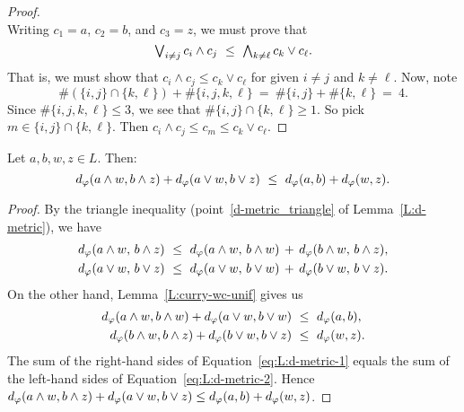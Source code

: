 \documentclass[main.tex]{subfiles}
\begin{document}
\begin{proof}
\begin{equation*}
\end{equation*}
Writing $c_1 = a$, $c_2 = b$, and $c_3 = z$,
we must prove that 
\begin{equation*}
\textstyle{\bigvee}_{i\neq j}\, c_i \wedge c_j \ \leq\ \textstyle{\bigwedge}_{k\neq \ell}\, c_k \vee c_\ell.
\end{equation*}
That is,
we must show that 
$c_i \wedge c_j \leq c_k \vee c_\ell$
for given $i\neq j$ and $k\neq \ell$.
Now, note
\begin{equation*}
\# (\{ i,j \} \cap \{ k,\ell\}) + \#\{i,j,k,\ell\}
\ = \ \# \{i,j\} + \# \{k,\ell \}
\ = \ 4.
\end{equation*}
Since  $\# \{ i,j,k,\ell \}\leq 3$,
we see that $\# \{ i,j \} \cap \{ k,\ell\} \geq 1$.
So pick $m\in  \{ i,j \} \cap \{ k,\ell\}$.
Then $c_i \wedge c_j \leq c_m \leq c_k \vee c_\ell$.
\end{proof}
%
%
\begin{lem}
\label{L:wv-unif}
Let $a,b,w,z\in L$.  Then:
\begin{equation*}
\ld\varphi(a\wedge w,b\wedge z) + \ld\varphi(a \vee w,b\vee z)
\ \leq\ 
\ld\varphi(a,b) + \ld\varphi(w,z).
\end{equation*}
\end{lem}
\begin{proof}
By the triangle inequality (point~\ref{d-metric_triangle}
of Lemma~\ref{L:d-metric}),
we have
\begin{equation}
\label{eq:L:d-metric-1}
\begin{alignedat}{3}
\ld\varphi(a\wedge w,\,b\wedge z)\ &\leq\ 
\ld\varphi(a\wedge w,\,b\wedge w)\,+\,
\ld\varphi(b\wedge w,\,b\wedge z), \\
\ld\varphi(a\vee w,\,b\vee z)\ &\leq\ 
\ld\varphi(a\vee w,\,b\vee w)\,+\,
\ld\varphi(b\vee w,\,b\vee z).
\end{alignedat}
\end{equation}
On the other hand, Lemma~\ref{L:curry-wc-unif} gives us
\begin{equation}
\label{eq:L:d-metric-2}
\begin{alignedat}{3}
d_\varphi(a\wedge w,b\wedge w) + d_\varphi(a\vee w,b\vee w)
   \ &\leq\ d_\varphi(a,b), \\
d_\varphi(b\wedge w,b\wedge z) + d_\varphi(b\vee w, b\vee z)
   \ &\leq\ d_\varphi(w,z).
\end{alignedat}
\end{equation}
The sum of the right-hand sides of Equation~\eqref{eq:L:d-metric-1}
equals the sum of the left-hand sides of Equation~\eqref{eq:L:d-metric-2}.
Hence
$d_\varphi(a\wedge w,b\wedge z) + d_\varphi(a \vee w,b\vee z)
\leq 
d_\varphi(a,b) + d_\varphi(w,z)$.
\end{proof}
\end{document}
